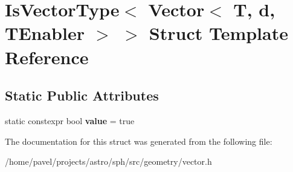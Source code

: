 \hypertarget{structIsVectorType_3_01Vector_3_01T_00_01d_00_01TEnabler_01_4_01_4}{}\section{Is\+Vector\+Type$<$ Vector$<$ T, d, T\+Enabler $>$ $>$ Struct Template Reference}
\label{structIsVectorType_3_01Vector_3_01T_00_01d_00_01TEnabler_01_4_01_4}
\subsection*{Static Public Attributes}
\begin{DoxyCompactItemize}
\item 
\hypertarget{structIsVectorType_3_01Vector_3_01T_00_01d_00_01TEnabler_01_4_01_4_ac6270b2b277eee4aa74659d033eae9a7}{}\label{structIsVectorType_3_01Vector_3_01T_00_01d_00_01TEnabler_01_4_01_4_ac6270b2b277eee4aa74659d033eae9a7} 
static constexpr bool {\bfseries value} = true
\end{DoxyCompactItemize}


The documentation for this struct was generated from the following file\+:\begin{DoxyCompactItemize}
\item 
/home/pavel/projects/astro/sph/src/geometry/vector.\+h\end{DoxyCompactItemize}
